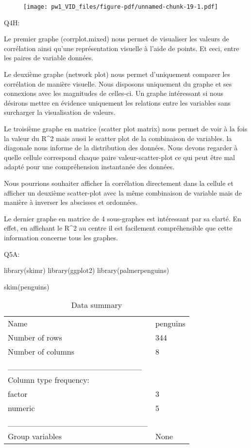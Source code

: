 \documentclass[
  letterpaper,
  DIV=11,
  numbers=noendperiod]{scrartcl}
\newenvironment{Shaded}{}{}
\newcommand{\FunctionTok}[1]{\textcolor[rgb]{0.44,0.26,0.76}{#1}}
\newcommand{\NormalTok}[1]{\textcolor[rgb]{0.14,0.16,0.18}{#1}}
\begin{document}
\begin{figure}[H]

{\centering \texttt{[image: pw1\_VID\_files/figure-pdf/unnamed-chunk-19-1.pdf]}

}

\end{figure}

Q4H:

Le premier graphe (corrplot.mixed) nous permet de visualiser les valeurs
de corrélation ainsi qu'une représentation visuelle à l'aide de points.
Et ceci, entre les paires de variable données.

Le deuxième graphe (network plot) nous permet d'uniquement comparer les
corrélation de manière visuelle. Nous disposons uniquement du graphe et
ses connexions avec les magnitudes de celles-ci. Un graphe intéressant
si nous désirons mettre en évidence uniquement les relations entre les
variables sans surcharger la visualisation de valeurs.

Le troisième graphe en matrice (scatter plot matrix) nous permet de voir
à la fois la valeur du R\^{}2 mais aussi le scatter plot de la
combinaison de variables. la diagonale nous informe de la distribution
des données. Nous devons regarder à quelle cellule correspond chaque
paire valeur-scatter-plot ce qui peut être mal adapté pour une
compréhension instantanée des données.

Nous pourrions souhaiter afficher la corrélation directement dans la
cellule et afficher un deuxième scatter-plot avec la même combinaison de
variable mais de manière à inverser les abscisses et ordonnées.

Le dernier graphe en matrice de 4 sous-graphes est intéressant par sa
clarté. En effet, en affichant le R\^{}2 au centre il est facilement
compréhensible que cette information concerne tous les graphes.

Q5A:

\begin{Shaded}
\begin{Highlighting}[]
\FunctionTok{library}\NormalTok{(skimr)}
\FunctionTok{library}\NormalTok{(ggplot2)}
\FunctionTok{library}\NormalTok{(palmerpenguins)}

\FunctionTok{skim}\NormalTok{(penguins)}
\end{Highlighting}
\end{Shaded}

\begin{longtable}[]{@{}ll@{}}
\caption{Data summary}\tabularnewline
\toprule\noalign{}
\endfirsthead
\endhead
\bottomrule\noalign{}
\endlastfoot
Name & penguins \\
Number of rows & 344 \\
Number of columns & 8 \\
\_\_\_\_\_\_\_\_\_\_\_\_\_\_\_\_\_\_\_\_\_\_\_ & \\
Column type frequency: & \\
factor & 3 \\
numeric & 5 \\
\_\_\_\_\_\_\_\_\_\_\_\_\_\_\_\_\_\_\_\_\_\_\_\_ & \\
Group variables & None \\
\end{longtable}
\end{document}
